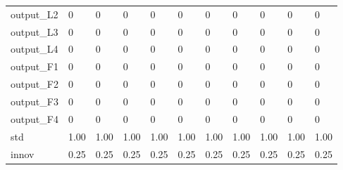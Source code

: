 \begin{tabular}{lllllllllll}
output\_L2 & 0 & 0 & 0 & 0 & 0 & 0 & 0 & 0 & 0 & 0 \\ 
output\_L3 & 0 & 0 & 0 & 0 & 0 & 0 & 0 & 0 & 0 & 0 \\ 
output\_L4 & 0 & 0 & 0 & 0 & 0 & 0 & 0 & 0 & 0 & 0 \\ 
output\_F1 & 0 & 0 & 0 & 0 & 0 & 0 & 0 & 0 & 0 & 0 \\ 
output\_F2 & 0 & 0 & 0 & 0 & 0 & 0 & 0 & 0 & 0 & 0 \\ 
output\_F3 & 0 & 0 & 0 & 0 & 0 & 0 & 0 & 0 & 0 & 0 \\ 
output\_F4 & 0 & 0 & 0 & 0 & 0 & 0 & 0 & 0 & 0 & 0 \\ 
std & 1.00 & 1.00 & 1.00 & 1.00 & 1.00 & 1.00 & 1.00 & 1.00 & 1.00 & 1.00 \\ 
innov & 0.25 & 0.25 & 0.25 & 0.25 & 0.25 & 0.25 & 0.25 & 0.25 & 0.25 & 0.25 \\ 
\hline 
\end{tabular}